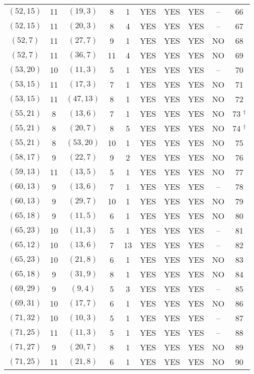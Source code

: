 \begin{longtable}{|c|c|c|c|c|c|c|c|c|c|}
$(52, 15)$ & 11 & $(19, 3)$ & 8 & 1 & YES & YES & YES & -- & 66\\
$(52, 15)$ & 11 & $(20, 3)$ & 8 & 4 & YES & YES & YES & -- & 67\\
$(52, 7)$ & 11 & $(27, 7)$ & 9 & 1 & YES & YES & YES & NO & 68\\
$(52, 7)$ & 11 & $(36, 7)$ & 11 & 4 & YES & YES & YES & NO & 69\\
$(53, 20)$ & 10 & $(11, 3)$ & 5 & 1 & YES & YES & YES & -- & 70\\
$(53, 15)$ & 11 & $(17, 3)$ & 7 & 1 & YES & YES & YES & NO & 71\\
$(53, 15)$ & 11 & $(47, 13)$ & 8 & 1 & YES & YES & YES & NO & 72\\
$(55, 21)$ & 8 & $(13, 6)$ & 7 & 1 & YES & YES & YES & NO & 73 ${}^\dagger$\\
$(55, 21)$ & 8 & $(20, 7)$ & 8 & 5 & YES & YES & YES & NO & 74 ${}^\dagger$\\
$(55, 21)$ & 8 & $(53, 20)$ & 10 & 1 & YES & YES & YES & NO & 75\\
$(58, 17)$ & 9 & $(22, 7)$ & 9 & 2 & YES & YES & YES & NO & 76\\
$(59, 13)$ & 11 & $(13, 5)$ & 5 & 1 & YES & YES & YES & NO & 77\\
$(60, 13)$ & 9 & $(13, 6)$ & 7 & 1 & YES & YES & YES & -- & 78\\
$(60, 13)$ & 9 & $(29, 7)$ & 10 & 1 & YES & YES & YES & NO & 79\\
$(65, 18)$ & 9 & $(11, 5)$ & 6 & 1 & YES & YES & YES & NO & 80\\
$(65, 23)$ & 10 & $(11, 3)$ & 5 & 1 & YES & YES & YES & -- & 81\\
$(65, 12)$ & 10 & $(13, 6)$ & 7 & 13 & YES & YES & YES & -- & 82\\
$(65, 23)$ & 10 & $(21, 8)$ & 6 & 1 & YES & YES & YES & NO & 83\\
$(65, 18)$ & 9 & $(31, 9)$ & 8 & 1 & YES & YES & YES & NO & 84\\
$(69, 29)$ & 9 & $(9, 4)$ & 5 & 3 & YES & YES & YES & -- & 85\\
$(69, 31)$ & 10 & $(17, 7)$ & 6 & 1 & YES & YES & YES & NO & 86\\
$(71, 32)$ & 10 & $(10, 3)$ & 5 & 1 & YES & YES & YES & -- & 87\\
$(71, 25)$ & 11 & $(11, 3)$ & 5 & 1 & YES & YES & YES & -- & 88\\
$(71, 27)$ & 9 & $(20, 7)$ & 8 & 1 & YES & YES & YES & NO & 89\\
$(71, 25)$ & 11 & $(21, 8)$ & 6 & 1 & YES & YES & YES & NO & 90\\

\end{longtable}
